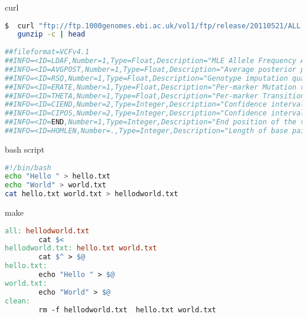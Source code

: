 \documentclass{beamer}
\begin{document}
\begin{frame}[fragile]
 \begin{center}
    \huge{curl}\\
    \end{center}
\begin{lstlisting}[language=bash]
$  curl "ftp://ftp.1000genomes.ebi.ac.uk/vol1/ftp/release/20110521/ALL.wgs.phase1_release_v3.20101123.snps_indels_sv.sites.vcf.gz" |\
   gunzip -c | head
   
##fileformat=VCFv4.1
##INFO=<ID=LDAF,Number=1,Type=Float,Description="MLE Allele Frequency Accounting for LD">
##INFO=<ID=AVGPOST,Number=1,Type=Float,Description="Average posterior probability from MaCH/Thunder">
##INFO=<ID=RSQ,Number=1,Type=Float,Description="Genotype imputation quality from MaCH/Thunder">
##INFO=<ID=ERATE,Number=1,Type=Float,Description="Per-marker Mutation rate from MaCH/Thunder">
##INFO=<ID=THETA,Number=1,Type=Float,Description="Per-marker Transition rate from MaCH/Thunder">
##INFO=<ID=CIEND,Number=2,Type=Integer,Description="Confidence interval around END for imprecise variants">
##INFO=<ID=CIPOS,Number=2,Type=Integer,Description="Confidence interval around POS for imprecise variants">
##INFO=<ID=END,Number=1,Type=Integer,Description="End position of the variant described in this record">
##INFO=<ID=HOMLEN,Number=.,Type=Integer,Description="Length of base pair identical micro-homology at event breakpoints">
\end{lstlisting}
\end{frame}


\begin{frame}[fragile]
 \begin{center}
    \huge{bash script}\\
    \end{center}
\begin{lstlisting}[language=bash]
#!/bin/bash
echo "Hello " > hello.txt
echo "World" > world.txt
cat hello.txt world.txt > hellodworld.txt
\end{lstlisting}
\end{frame}

\begin{frame}[fragile]
 \begin{center}
    \huge{make}\\
    \end{center}
\begin{lstlisting}[language=make]
all: hellodworld.txt
        cat $<
hellodworld.txt: hello.txt world.txt
        cat $^ > $@
hello.txt:
        echo "Hello " > $@
world.txt:
        echo "World" > $@
clean:
        rm -f hellodworld.txt  hello.txt world.txt
\end{lstlisting}
\end{frame}
\end{document}
